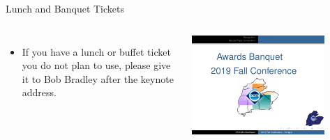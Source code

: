 \documentclass[handout]{beamer}
\begin{document}
\begin{frame}{Lunch and Banquet Tickets}
    \begin{columns}
    \begin{itemize}
        \item If you have a lunch or buffet ticket you do not plan to
            use, please give it to Bob Bradley after the keynote address.
    \end{itemize}
    \begin{center}
        \includegraphics[width=0.8\textwidth]{banquet}
    \end{center}
    \end{columns}
\end{frame}
\end{document}
